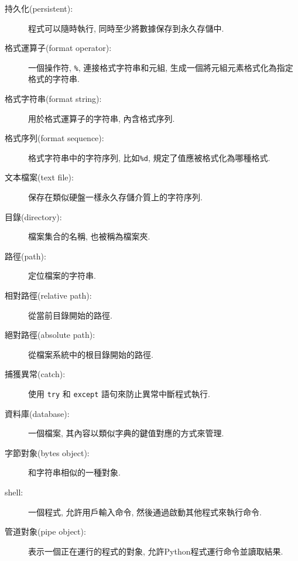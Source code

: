 \documentclass[10pt]{book}
\begin{document}
\begin{description}

\item[持久化(persistent):] 程式可以隨時執行, 同時至少將數據保存到永久存儲中. 

\item[格式運算子(format operator):] 一個操作符, {\tt \%}, 連接格式字符串和元組, 
生成一個將元組元素格式化為指定格式的字符串. 

\item[格式字符串(format string):] 用於格式運算子的字符串, 內含格式序列.  

\item[格式序列(format sequence):] 格式字符串中的字符序列, 
比如{\tt \%d}, 規定了值應被格式化為哪種格式.

\item[文本檔案(text file):] 保存在類似硬盤一樣永久存儲介質上的字符序列. 

\item[目錄(directory):] 檔案集合的名稱, 也被稱為檔案夾.

\item[路徑(path):] 定位檔案的字符串. 

\item[相對路徑(relative path):] 從當前目錄開始的路徑. 

\item[絕對路徑(absolute path):] 從檔案系統中的根目錄開始的路徑. 

\item[捕獲異常(catch):] 使用 {\tt try} 和 {\tt except} 語句來防止異常中斷程式執行. 

\item[資料庫(database):] 一個檔案, 其內容以類似字典的鍵值對應的方式來管理. 

\item[字節對象(bytes object):] 和字符串相似的一種對象.

\item[shell:] 一個程式, 允許用戶輸入命令, 然後通過啟動其他程式來執行命令. 

\item[管道對象(pipe object):] 表示一個正在運行的程式的對象, 
允許Python程式運行命令並讀取結果.

\end{description}
\end{document}
